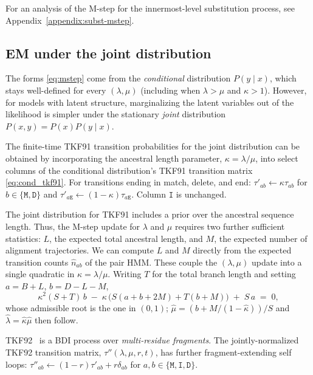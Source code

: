 \documentclass{article}
\newcommand{\ins}{\lambda}
\newcommand{\del}{\mu}
\newcommand{\ext}{r}
\newcommand{\hst}[1]{\texttt{#1}}
\begin{document}
For an analysis of the M-step for the innermost-level substitution process, see Appendix~\ref{appendix:subst-mstep}.

\subsection{EM under the joint distribution}

The forms \eqref{eq:mstep} come from the \emph{conditional} distribution
$P(y\mid x)$, which stays well-defined for every $(\ins,\del)$
(including when $\ins{>}\del$ and $\kappa{>}1$).
However, for models with latent structure, marginalizing the latent 
variables out of the likelihood is simpler under the stationary 
\emph{joint} distribution $P(x,y)=P(x)P(y\mid x)$.

The finite-time TKF91 transition probabilities for the joint distribution can be 
obtained by incorporating the ancestral length parameter, $\kappa=\ins/\del$, 
into select columns of the conditional distribution's TKF91 transition matrix 
\eqref{eq:cond_tkf91}. For transitions ending in match, delete, and end:
$\tau'_{ab} \leftarrow \kappa \tau_{ab}$ for $b\in\{\hst{M},\hst{D}\}$ and $\tau'_{a \hst{E}} \leftarrow (1-\kappa)\tau_{a \hst{E}}$.
Column $\hst{I}$ is unchanged.

The joint distribution for TKF91 includes a prior over the ancestral sequence length. 
Thus, the M-step update for $\lambda$ and $\mu$ requires two further sufficient statistics: $L$, the
expected total ancestral length, and $M$, the expected number of
alignment trajectories. 
We can compute $L$ and $M$ directly from the expected transition counts $\hat n_{ab}$ of the pair HMM.
These couple the $(\ins,\del)$ update into a
single quadratic in $\kappa=\ins/\del$.
Writing $T$ for the total branch length and setting
$a=B+L$, $b=D-L-M$,
\begin{equation}
	\label{eq:kappa-quadratic}
	\kappa^2 (S+T)\,b \;-\; \kappa\,\bigl(S(a+b+2M)+T(b+M)\bigr) \;+\; S\,a \;=\; 0,
\end{equation}
whose admissible root is the one in $(0,1)$;
$\hat\del=(b+M/(1-\hat\kappa))/S$ and $\hat\ins=\hat\kappa\hat\del$ then
follow. 

TKF92~\cite{ThorneEtAl92} is a BDI process over \textit{multi-residue fragments}. The jointly-normalized TKF92 transition matrix, $\tau''(\ins,\del,\ext,t)$, has further fragment-extending self loops:
$\tau''_{ab} \leftarrow (1-\ext)\tau'_{ab} + \ext \delta_{ab}$ for $a,b \in \{ \hst{M}, \hst{I}, \hst{D} \}$.
\end{document}
